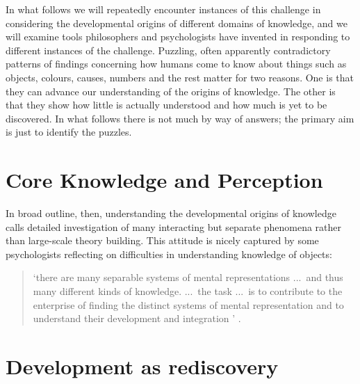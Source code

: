 \documentclass[12pt,\papersize]{extarticle}
\begin{document}
In what follows we will repeatedly encounter instances of this challenge  in considering the developmental origins of different domains of knowledge, 
and we will examine tools philosophers and psychologists have invented in responding to different instances of the challenge.  
Puzzling, often apparently contradictory patterns of findings concerning how humans come to know about things such as objects, colours, causes, numbers and the rest matter for two reasons.
One is that they can advance our understanding of  the origins of knowledge.
The other is that they show how little is actually understood and how much is yet to be discovered.
In what follows there is not much by way of answers; the primary aim is just to identify the puzzles.




\section{Core Knowledge and Perception}


In broad outline, then, understanding the developmental origins of knowledge calls detailed investigation of many interacting but separate phenomena rather than large-scale theory building. 
This attitude is nicely captured by some psychologists reflecting on difficulties in understanding knowledge of objects:
%
\begin{quote}
`there are many separable systems of mental representations ...\ and thus many different kinds of knowledge. ...\ the task ...\ is to contribute to the enterprise of finding the distinct systems of mental representation and to understand their development and integration%
'
\citep[p.\ 1522]{Hood:2000bf}.
\end{quote}
%


\section{Development as rediscovery}
\end{document}
